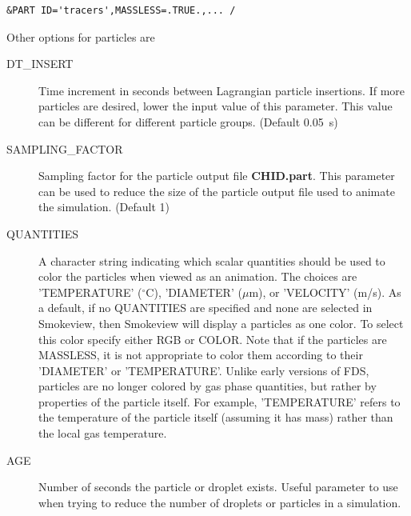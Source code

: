 \documentclass[11pt]{book}
\begin{document}
\footnotesize
\begin{verbatim}
&PART ID='tracers',MASSLESS=.TRUE.,... /
\end{verbatim}
\normalsize
Other options for particles are
\begin{description}
\item[{\ct DT\_INSERT}]    Time increment in seconds between Lagrangian particle insertions.
If more particles are desired, lower the input value of this parameter. This value can be different
for different particle groups. (Default 0.05~s)
\item[{\ct SAMPLING\_FACTOR}]     Sampling factor for the particle output
file {\bf CHID.part}. This parameter can be used to reduce the size
of the particle output file used to animate the simulation. (Default 1)
\item[{\ct QUANTITIES}] A character string indicating which
scalar quantities should be used to color the particles when viewed as an
animation. The choices are {\ct 'TEMPERATURE'} ($^\circ$C), {\ct 'DIAMETER'} ($\mu$m),
or {\ct 'VELOCITY'} (m/s).
As a default, if no {\ct QUANTITIES} are specified and none are selected in Smokeview, then
Smokeview will display a particles as one color.  To select  this color specify either {\ct RGB} or
{\ct COLOR}. Note that if the
particles are {\ct MASSLESS}, it is not appropriate to color them according to their
{\ct 'DIAMETER'} or {\ct 'TEMPERATURE'}. Unlike early versions of FDS, particles are no longer
colored by gas phase quantities, but rather by properties of the particle itself. For example,
{\ct 'TEMPERATURE'} refers to the temperature of the particle itself (assuming it has mass)
rather than the local gas temperature.
\item[{\ct AGE}]  Number of seconds the particle or droplet exists. Useful parameter to use when
trying to reduce the number of droplets or particles in a simulation.
\end{description}
\end{document}
